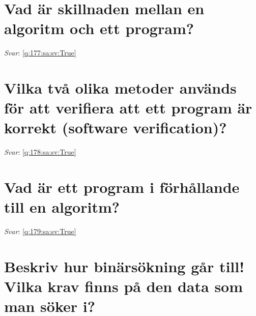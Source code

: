 \documentclass[a4paper,11pt,oneside]{book}
\begin{document}
\begin{sloppypar}
\section{Vad \"ar skillnaden mellan en algoritm och ett program?}

\label{q:177:sa:sv:False}

\vspace{2cm}

\noindent\makebox[\textwidth]{\hrulefill}

\vspace{1cm}

\textit{Svar}: \autoref{q:177:sa:sv:True}



\section{Vilka tv\r{a} olika metoder anv\"ands f\"or att verifiera att ett program \"ar korrekt (software verification)?}

\label{q:178:sa:sv:False}

\vspace{2cm}

\noindent\makebox[\textwidth]{\hrulefill}

\vspace{1cm}

\textit{Svar}: \autoref{q:178:sa:sv:True}



\section{Vad \"ar ett program i f\"orh\r{a}llande till en algoritm?}

\label{q:179:sa:sv:False}

\vspace{2cm}

\noindent\makebox[\textwidth]{\hrulefill}

\vspace{1cm}

\textit{Svar}: \autoref{q:179:sa:sv:True}



\section{Beskriv hur bin\"ars\"okning g\r{a}r till! Vilka krav finns p\r{a} den data som man s\"oker i?}

\label{q:180:sa:sv:False}


\end{sloppypar}
\end{document}
